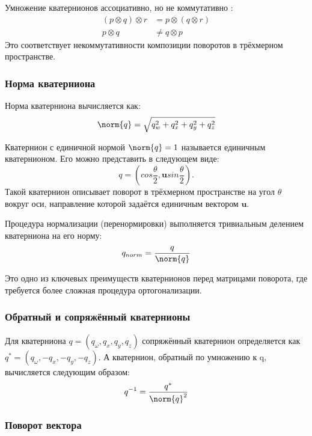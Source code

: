 Умножение кватернионов ассоциативно, но не коммутативно \cite{hypercomplex_number}:
\begin{align*}
	(p \otimes q) \otimes r &= p \otimes (q \otimes r) 	\\
	p \otimes q &\neq q \otimes p
\end{align*}
Это соответствует некоммутативности композиции поворотов в трёхмерном пространстве.


\subsubsection{Норма кватерниона}
Норма кватерниона вычисляется как:
\begin{equation*}
	\norm{q} = \sqrt{q_w^2 + q_x^2 + q_y^2 + q_z^2}
\end{equation*}

Кватернион с единичной нормой $\norm{q} = 1$ называется единичным кватернионом. Его можно представить в следующем виде:
\begin{equation}
\label{eq:geometry_interp_q}
	q = \left( cos \frac{\theta}{2}, \bm{u} sin \frac{\theta}{2} \right) \text{.}
\end{equation}
Такой кватернион описывает поворот в трёхмерном пространстве на угол $\theta$ вокруг оси, направление которой задаётся единичным вектором $\bm{u}$.

Процедура нормализации (перенормировки) выполняется тривиальным делением кватерниона на его норму:
\begin{equation*}
\label{eq:q_norm}
	q_{norm} = \frac{q}{\norm{q}}
\end{equation*}

Это одно из ключевых преимуществ кватернионов перед матрицами поворота, где требуется более сложная процедура ортогонализации.


\subsubsection{Обратный и сопряжённый кватернионы}
Для кватерниона $q = (q_{\omega}, q_x, q_y, q_z)$ сопряжённый кватернион определяется как $q^* = (q_{\omega}, -q_x, -q_y, -q_z)$. А кватернион, обратный по умножению к q, вычисляется следующим образом:\\
\begin{equation*}
	q^{-1} = \frac{q^*}{\norm{q}^2}
\end{equation*}



\subsubsection{Поворот вектора}

